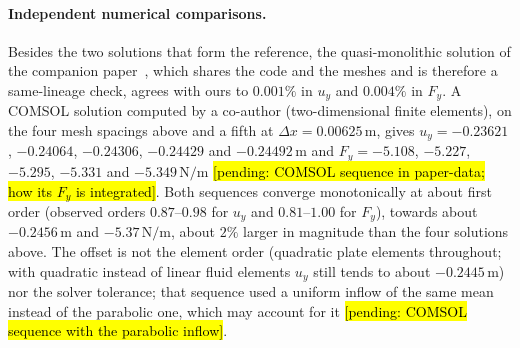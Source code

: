 \paragraph{Independent numerical comparisons.}
Besides the two solutions that form the reference, the quasi-monolithic solution of the companion paper~\citep{CardiffBatistic2026QM}, which shares the code and the meshes and is therefore a same-lineage check, agrees with ours to $0.001\%$ in $u_y$ and $0.004\%$ in $F_y$.
A COMSOL solution computed by a co-author (two-dimensional finite elements), on the four mesh spacings above and a fifth at $\Delta x = 0.00625\,\mathrm{m}$, gives $u_y = -0.23621$, $-0.24064$, $-0.24306$, $-0.24429$ and $-0.24492\,\mathrm{m}$ and $F_y = -5.108$, $-5.227$, $-5.295$, $-5.331$ and $-5.349\,\mathrm{N/m}$ \hl{[pending: COMSOL sequence in paper-data; how its $F_y$ is integrated]}.
Both sequences converge monotonically at about first order (observed orders $0.87$--$0.98$ for $u_y$ and $0.81$--$1.00$ for $F_y$), towards about $-0.2456\,\mathrm{m}$ and $-5.37\,\mathrm{N/m}$, about $2\%$ larger in magnitude than the four solutions above.
The offset is not the element order (quadratic plate elements throughout; with quadratic instead of linear fluid elements $u_y$ still tends to about $-0.2445\,\mathrm{m}$) nor the solver tolerance; that sequence used a uniform inflow of the same mean instead of the parabolic one, which may account for it \hl{[pending: COMSOL sequence with the parabolic inflow]}.

